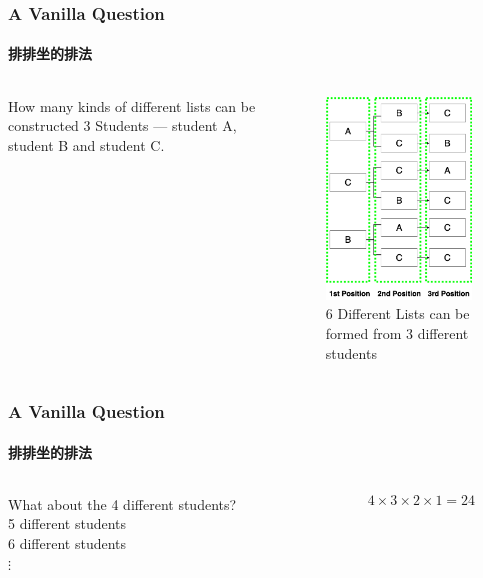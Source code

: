 \documentclass[
	11pt, %
]{beamer}
\begin{document}
\begin{frame}
	\frametitle{A Vanilla Question} %
	\framesubtitle{排排坐的排法}
	\begin{columns}[t] 
		\begin{column}{0.3\textwidth} %
			How many kinds of different lists can be constructed 3 Students --- student A, student B and student C.  
		\end{column}
		\begin{column}{0.7\textwidth} %
		  \pause
			\begin{figure}
				\includegraphics[width=0.5\linewidth]{Permutation3.png}
				\caption{6 Different Lists can be formed from 3 different students}
			\end{figure}
		\end{column}
	\end{columns}
\end{frame}



\begin{frame}
	\frametitle{A Vanilla Question} %
	\framesubtitle{排排坐的排法}
	\begin{columns}[t] 
		\begin{column}{0.3\textwidth} %
		   What about the 4 different students?\\
		   5 different students\\
		   6 different students\\
		   $\vdots$

		\end{column}
		\begin{column}{0.7\textwidth} %
		  \pause
		  \begin{equation*}
		  		  	4 \times 3 \times 2 \times 1 = 24 
		  \end{equation*}
		\end{column}
	\end{columns}
\end{frame}
\end{document}
